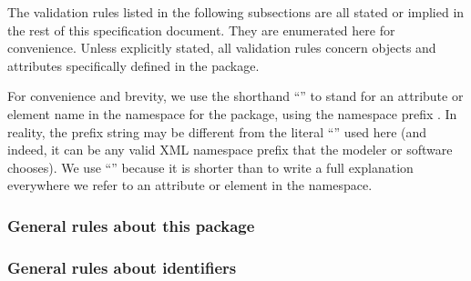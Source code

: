 The validation rules listed in the following subsections are all stated
or implied in the rest of this specification document. They are
enumerated here for convenience. Unless explicitly stated, all
validation rules concern objects and attributes specifically defined in
the \SystemsBiologyGraphicalNotationMarkupLanguagePackage package.

For \notice convenience and brevity, we use the shorthand
``'' to stand for an attribute or element name
 in the namespace for the
\SystemsBiologyGraphicalNotationMarkupLanguagePackage package, using
the namespace prefix . In reality, the prefix string may
be different from the literal ``'' used here (and indeed,
it can be any valid XML namespace prefix that the modeler or software
chooses). We use ``'' because it is shorter than to
write a full explanation everywhere we refer to an attribute or element
in the \SystemsBiologyGraphicalNotationMarkupLanguagePackage namespace.

\subsubsection*{General rules about this package}



\subsubsection*{General rules about identifiers}


